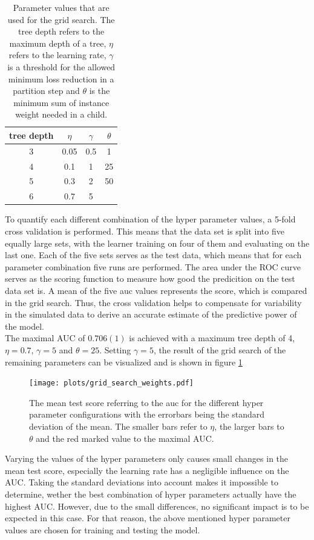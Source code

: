   \begin{table}
    \centering
    \begin{tabular}{c c c c}
      \toprule
      tree depth & $\eta$ & $\gamma$ & $\theta$ \\
      \midrule
      3 & 0.05 & 0.5 & 1  \\
      4 & 0.1  & 1   & 25  \\
      5 & 0.3  & 2 & 50  \\
      6 & 0.7  & 5   &  \\
    \end{tabular}
    \caption{Parameter values that are used for the grid search. The tree depth refers to the maximum depth of a tree, $\eta$ refers to the learning rate,
    $\gamma$ is a threshold for the allowed minimum loss reduction in a partition step and $\theta$ is the minimum sum of instance weight needed in a child.}
    \label{tab:grid}
  \end{table}
To quantify each different combination of the hyper parameter values, a 5-fold cross validation is performed. This means that the data set is split into five equally
large sets, with the learner training on four of them and evaluating on the last one. Each of the five sets serves as the test data, which means that for each
parameter combination five runs are performed. The area under the ROC curve serves as the scoring function to measure how good the predicition on the test data set is.
A mean of the five auc values represents the score, which is compared in the grid search. Thus, the cross validation helps to compensate for variability in the simulated
data to derive an accurate estimate of the predictive power of the model. \\
The maximal AUC of $0.706(1)$ is achieved with a maximum tree depth of 4, $\eta=0.7$, $\gamma=5$ and $\theta=25$. Setting $\gamma=5$, the result of the grid search of the remaining
parameters can be visualized and is shown in figure \ref{fig:grid}

\begin{figure}
  \centering
  \texttt{[image: plots/grid\_search\_weights.pdf]}
  \caption{The mean test score referring to the auc for the different hyper parameter configurations with the errorbars being the standard deviation of the mean. The
  smaller bars refer to $\eta$, the larger bars to $\theta$ and the red marked value to the maximal AUC.}
  \label{fig:grid}
\end{figure}

Varying the values of the hyper parameters only causes small changes in the mean test score, especially the learning rate has a negligible influence on the AUC. Taking the
standard deviations into account makes it impossible to determine, wether the best combination of hyper parameters actually have the highest AUC. However, due to the
small differences, no significant impact is to be expected in this case. For that reason, the above mentioned hyper parameter values are chosen for training and testing the model.

